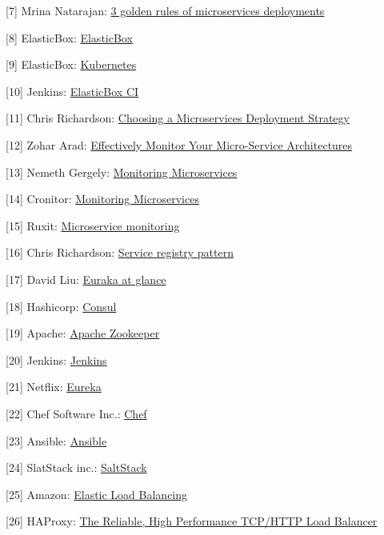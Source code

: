\documentclass[11pt,magyar,a4paper,oneside,]{report}
\begin{document}
{[}7{]} Mrina Natarajan:
\href{http://devops.com/2015/05/07/3-golden-rules-microservices-deployments/}{3
golden rules of microservices deployments}

{[}8{]} ElasticBox:
\href{https://elasticbox.com/how-it-works}{ElasticBox}

{[}9{]} ElasticBox: \href{https://elasticbox.com/kubernetes}{Kubernetes}

{[}10{]} Jenkins:
\href{https://wiki.jenkins-ci.org/display/JENKINS/ElasticBox+CI}{ElasticBox
CI}

{[}11{]} Chris Richardson:
\href{https://www.nginx.com/blog/deploying-microservices/}{Choosing a
Microservices Deployment Strategy}

{[}12{]} Zohar Arad:
\href{http://zohararad.github.io/presentations/micro-services-monitoring/}{Effectively
Monitor Your Micro-Service Architectures}

{[}13{]} Nemeth Gergely:
\href{https://www.loggly.com/blog/monitoring-microservices-three-ways-to-overcome-the-biggest-challenges/}{Monitoring
Microservices}

{[}14{]} Cronitor:
\href{https://cronitor.io/help/micro-service-monitoring}{Monitoring
Microservices}

{[}15{]} Ruxit:
\href{https://ruxit.com/microservices/\#microservices_start}{Microservice
monitoring}

{[}16{]} Chris Richardson:
\href{http://microservices.io/patterns/service-registry.html}{Service
registry pattern}

{[}17{]} David Liu:
\href{https://github.com/Netflix/eureka/wiki/Eureka-at-a-glance}{Euraka
at glance}

{[}18{]} Hashicorp: \href{https://www.consul.io/}{Consul}

{[}19{]} Apache: \href{http://zookeeper.apache.org/}{Apache Zookeeper}

{[}20{]} Jenkins: \href{https://jenkins.io/index.html}{Jenkins}

{[}21{]} Netflix: \href{https://github.com/Netflix/eureka/wiki}{Eureka}

{[}22{]} Chef Software Inc.: \href{https://www.chef.io/chef/}{Chef}

{[}23{]} Ansible: \href{https://www.ansible.com/}{Ansible}

{[}24{]} SlatStack inc.: \href{http://saltstack.com/}{SaltStack}

{[}25{]} Amazon:
\href{https://aws.amazon.com/elasticloadbalancing/}{Elastic Load
Balancing}

{[}26{]} HAProxy: \href{http://www.haproxy.org/}{The Reliable, High
Performance TCP/HTTP Load Balancer}
\end{document}
